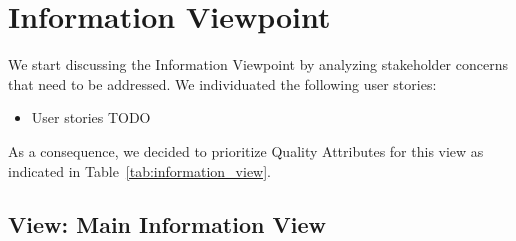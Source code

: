 \section{Information Viewpoint}
We start discussing the Information Viewpoint by analyzing stakeholder concerns that need to be addressed.
We individuated the following user stories:
\begin{itemize}
    \item User stories TODO
\end{itemize}

As a consequence, we decided to prioritize Quality Attributes for this view as indicated in Table~\ref{tab:information_view}.

\begin{table}[h!]
    \centering
    \caption{Information View Prioritized Quality Attributes}
    \label{tab:information_view}
\end{table}

\subsection{View: Main Information View}
